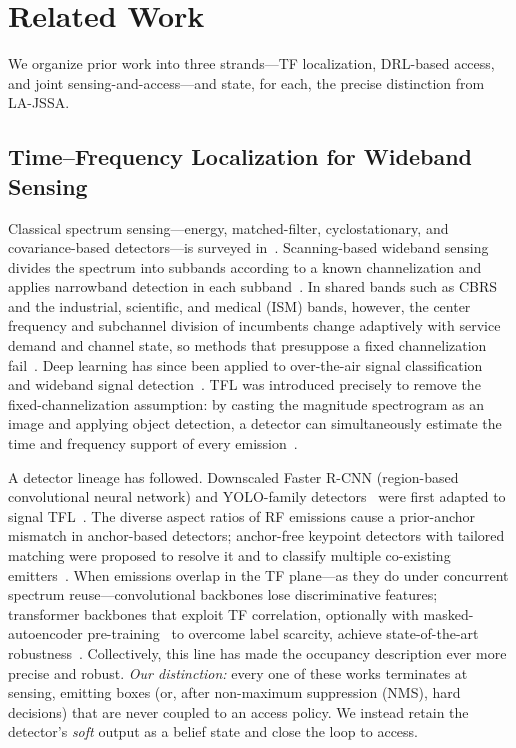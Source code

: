 \section{Related Work}
\label{sec:related_work}

We organize prior work into three strands---TF localization, DRL-based
access, and joint sensing-and-access---and state, for each, the precise
distinction from LA-JSSA.

\subsection{Time--Frequency Localization for Wideband Sensing}
Classical spectrum sensing---energy, matched-filter, cyclostationary, and
covariance-based detectors---is surveyed
in~\cite{yucek2009survey,axell2012spectrum,arjoune2019comprehensive}.
Scanning-based wideband sensing divides the spectrum into subbands according
to a known channelization and applies narrowband detection in each
subband~\cite{wang2018}. In shared bands such as CBRS and the industrial,
scientific, and medical (ISM) bands, however, the
center frequency and subchannel division of incumbents change adaptively with
service demand and channel state, so methods that presuppose a fixed
channelization fail~\cite{sohul2015cbrs}. Deep learning has since been applied
to over-the-air signal classification~\cite{oshea2018over,oshea2021dataset}
and wideband signal detection~\cite{vo2020wideband}. TFL was introduced
precisely to remove the fixed-channelization assumption: by casting the
magnitude spectrogram as an image and applying object detection, a detector
can simultaneously estimate the time and frequency support of every
emission~\cite{prasad2020,prasad2021spectrum}.

A detector lineage has followed. Downscaled Faster R-CNN (region-based
convolutional neural network) and YOLO-family
detectors~\cite{redmon2018yolov3} were first adapted to signal TFL~\cite{prasad2020,li2022hf}. The
diverse aspect ratios of RF emissions cause a prior-anchor mismatch in
anchor-based detectors; anchor-free keypoint detectors with tailored matching
were proposed to resolve it and to classify multiple co-existing
emitters~\cite{zhao2024uav}. When emissions overlap in the TF plane---as they
do under concurrent spectrum reuse---convolutional backbones lose
discriminative features; transformer backbones that exploit TF correlation,
optionally with masked-autoencoder pre-training~\cite{he2022mae} to overcome label scarcity,
achieve state-of-the-art robustness~\cite{zhao2025trtfl_ssl,
zhang2024spectrumtransformer,he2022mae}. Collectively, this line has made the
occupancy description ever more precise and robust. \emph{Our distinction:}
every one of these works terminates at sensing, emitting boxes (or, after
non-maximum suppression (NMS), hard decisions) that are never coupled to an access
policy. We instead retain the detector's \emph{soft} output as a belief state
and close the loop to access.

